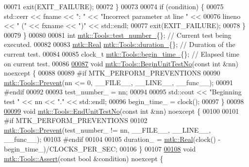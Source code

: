 \begin{DoxyCode}
00071     exit(EXIT\_FAILURE);
00072   \}
00073 
00074   \textcolor{keywordflow}{if} (condition) \{
00075     std::cerr << fname << \textcolor{stringliteral}{": "} << \textcolor{stringliteral}{"Incorrect parameter at line "} <<
00076     lineno << \textcolor{stringliteral}{" ("} << fxname << \textcolor{stringliteral}{")"} << std::endl;
00077     exit(EXIT\_FAILURE);
00078   \}
00079 \}
00080 
00081 \textcolor{keywordtype}{int} \hyperlink{classmtk_1_1Tools_a04a60458594336ee1badff79b8a9a77f}{mtk::Tools::test\_number\_}\{\};   \textcolor{comment}{// Current test being executed.}
00082 
00083 \hyperlink{group__c01-roots_gac080bbbf5cbb5502c9f00405f894857d}{mtk::Real} \hyperlink{classmtk_1_1Tools_aba9d3d2952a3de9e7b46faa86d28d692}{mtk::Tools::duration\_}\{\};    \textcolor{comment}{// Duration of the current test.}
00084 
00085 clock\_t \hyperlink{classmtk_1_1Tools_a4bd58d08397db42271ed9e2d3ecc9963}{mtk::Tools::begin\_time\_}\{\};  \textcolor{comment}{// Elapsed time on current test.}
00086 
\hypertarget{mtk__tools_8cc_source_l00087}{}\hyperlink{classmtk_1_1Tools_afc29ecaf337a13ed2e817d3890a5a441}{00087} \textcolor{keywordtype}{void} \hyperlink{classmtk_1_1Tools_afc29ecaf337a13ed2e817d3890a5a441}{mtk::Tools::BeginUnitTestNo}(\textcolor{keyword}{const} \textcolor{keywordtype}{int} &nn) noexcept \{
00088 
00089 \textcolor{preprocessor}{  #if MTK\_PERFORM\_PREVENTIONS}
00090   \hyperlink{classmtk_1_1Tools_a332324c6f25e66be9dff48c5987a3b9f}{mtk::Tools::Prevent}(nn <= 0, \_\_FILE\_\_, \_\_LINE\_\_, \_\_func\_\_);
00091 \textcolor{preprocessor}{  #endif}
00092 
00093   test\_number\_ = nn;
00094 
00095   std::cout << \textcolor{stringliteral}{"Beginning test "} << nn << \textcolor{stringliteral}{"."} << std::endl;
00096   begin\_time\_ = clock();
00097 \}
00098 
\hypertarget{mtk__tools_8cc_source_l00099}{}\hyperlink{classmtk_1_1Tools_aba67d9dc35c9c1c49430fcc9ea035e03}{00099} \textcolor{keywordtype}{void} \hyperlink{classmtk_1_1Tools_aba67d9dc35c9c1c49430fcc9ea035e03}{mtk::Tools::EndUnitTestNo}(\textcolor{keyword}{const} \textcolor{keywordtype}{int} &nn) noexcept \{
00100 
00101 \textcolor{preprocessor}{  #if MTK\_PERFORM\_PREVENTIONS}
00102   \hyperlink{classmtk_1_1Tools_a332324c6f25e66be9dff48c5987a3b9f}{mtk::Tools::Prevent}(test\_number\_ != nn, \_\_FILE\_\_, \_\_LINE\_\_, \_\_func\_\_);
00103 \textcolor{preprocessor}{  #endif}
00104 
00105   duration\_ = \hyperlink{group__c01-roots_gac080bbbf5cbb5502c9f00405f894857d}{mtk::Real}(clock() - begin\_time\_)/CLOCKS\_PER\_SEC;
00106 \}
00107 
\hypertarget{mtk__tools_8cc_source_l00108}{}\hyperlink{classmtk_1_1Tools_ac6804df469c94ab6a796fb64f1e44a89}{00108} \textcolor{keywordtype}{void} \hyperlink{classmtk_1_1Tools_ac6804df469c94ab6a796fb64f1e44a89}{mtk::Tools::Assert}(\textcolor{keyword}{const} \textcolor{keywordtype}{bool} &condition) noexcept \{

\end{DoxyCode}
